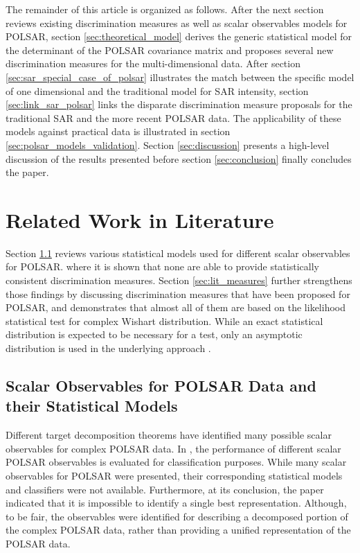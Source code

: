 \documentclass[journal]{IEEEtran}
\begin{document}
The remainder of this article is organized as follows.
After the next section reviews existing discrimination measures as well as scalar observables models for POLSAR, section \ref{sec:theoretical_model}
  derives the generic statistical model for the determinant of the POLSAR covariance matrix
  and proposes several new discrimination measures for the multi-dimensional data.
After section \ref{sec:sar_special_case_of_polsar} illustrates the match between the specific model of one dimensional and the traditional model for SAR intensity,
  section \ref{sec:link_sar_polsar} links the disparate discrimination measure proposals for the traditional SAR and the more recent POLSAR data.
The applicability of these models against practical data is illustrated in section \ref{sec:polsar_models_validation}.
Section \ref{sec:discussion} presents a high-level discussion of the results presented before
  section \ref{sec:conclusion} finally concludes the paper.

\section{Related Work in Literature}
\label{sec:lit_review}

Section \ref{sec:lit_models} reviews various statistical models used for different scalar observables for POLSAR.
  where it is shown that none are able to provide statistically consistent discrimination measures. 
Section \ref{sec:lit_measures} further strengthens those findings by discussing discrimination measures that have been proposed for POLSAR,
  and demonstrates that almost all of them are based on the likelihood statistical test for complex Wishart distribution.
While an exact statistical distribution is expected to be necessary for a test,
  only an asymptotic distribution is used in the underlying approach \cite{Conradsen_2003_TGRS_4}.
  
\subsection{Scalar Observables for POLSAR Data and their Statistical Models}
\label{sec:lit_models}

Different target decomposition theorems have identified many possible scalar observables for complex POLSAR data.
In \cite{Alberga_2008_IJRS_4129}, the performance of different scalar POLSAR observables is evaluated for classification purposes.
While many scalar observables for POLSAR were presented, their corresponding statistical models and classifiers were not available.
Furthermore, at its conclusion, the paper indicated that it is impossible to identify a single best representation.
Although, to be fair, the observables were identified for describing a decomposed portion of the complex POLSAR data,
  rather than providing a unified representation of the POLSAR data.
\end{document}
